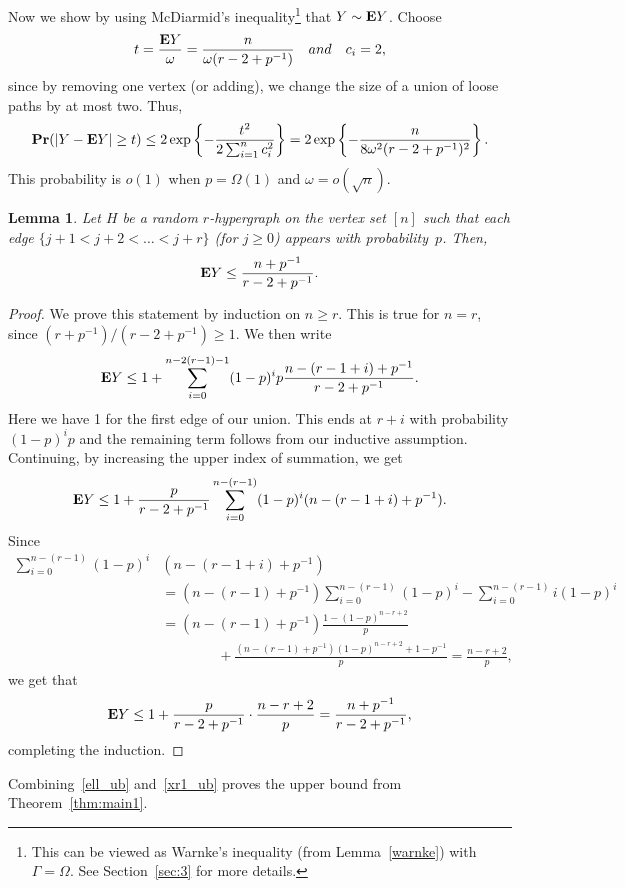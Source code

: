 \documentclass[12pt,reqno]{amsart}
\newtheorem{lemma}[theorem]{Lemma}
\theoremstyle{remark}
\def\E{\mbox{{\bf E}}}
\def\Pr{\mbox{{\bf Pr}}}
\def\E{\mbox{{\bf E}}}
\def\Pr{\mbox{{\bf Pr}}}
\begin{document}
Now we show by using McDiarmid's inequality\footnote{This can be viewed as Warnke's inequality (from Lemma~\ref{warnke}) with $\Gamma=\Omega$. See Section~\ref{sec:3} for more details.} that $Y\sim\E Y$. Choose 
\[
t=\frac{\E Y}{\omega} = \frac{n}{\omega(r-2 + p^{-1})} \quad { and } \quad c_i=2,
\]
since by removing one vertex (or adding), we change the size of a union of loose paths by at most two. Thus,
\[
\Pr(|Y-\E Y| \ge t) \le 2 \exp\left\{-\frac{t^2}{2\sum_{i=1}^n c_i^2}\right\}
= 2 \exp\left\{-\frac{n}{8\omega^2 (r-2 + p^{-1})^2}\right\}.
\]
This probability is $o(1)$ when $p=\Omega(1)$ and $\omega = o(\sqrt{n})$.
\begin{lemma}\label{lem:x_r_1}
Let $H$ be a random $r$-hypergraph on the vertex set $[n]$ such that each edge $\{j+1<j+2<\dots<j+r\}$ (for $j\ge0$) appears with probability~$p$. Then,
\[
\E Y\leq \frac{n+p^{-1}}{r-2 +p^{-1}}.
\]
\end{lemma}
\begin{proof}
We prove this statement by induction on $n\ge r$. This is true for $n=r$, since $(r+p^{-1})/(r-2+p^{-1})\geq 1$. We then write
\begin{equation*}%
\E Y\leq 1+\sum_{i=0}^{n-2(r-1)-1}(1-p)^ip\frac{n-(r-1+i)+p^{-1}}{r-2+p^{-1}}.
\end{equation*}
Here we have 1 for the first edge of our union. This ends at $r+i$ with probability $(1-p)^ip$ and the remaining term follows from our inductive assumption. Continuing, by increasing the upper index of summation, we get 
\[
\E Y \leq 1+\frac{p}{r-2+p^{-1}}\sum_{i=0}^{n-(r-1)}(1-p)^i(n-(r-1+i)+p^{-1}).
\]
Since
\begin{align*}
\sum_{i=0}^{n-(r-1)}(1-p)^i&(n-(r-1+i)+p^{-1})\\
&=(n-(r-1)+p^{-1}) \sum_{i=0}^{n-(r-1)}(1-p)^i - \sum_{i=0}^{n-(r-1)}i(1-p)^i\\
&=(n-(r-1)+p^{-1})\frac{1-(1-p)^{n-r+2}}{p}\\ 
&\qquad\qquad+ \frac{(n-(r-1)+p^{-1})(1-p)^{n-r+2}+1-p^{-1}}{p}
=\frac{n-r+2}{p},
\end{align*}
we get that
\[
\E Y\leq 1+\frac{p}{r-2+p^{-1}}\cdot \frac{n-r+2}{p}=\frac{n+p^{-1}}{r-2+p^{-1}},
\]
completing the induction.
\end{proof}
Combining~\eqref{ell_ub} and~\eqref{xr1_ub} proves the upper bound from Theorem~\ref{thm:main1}.
\end{document}
